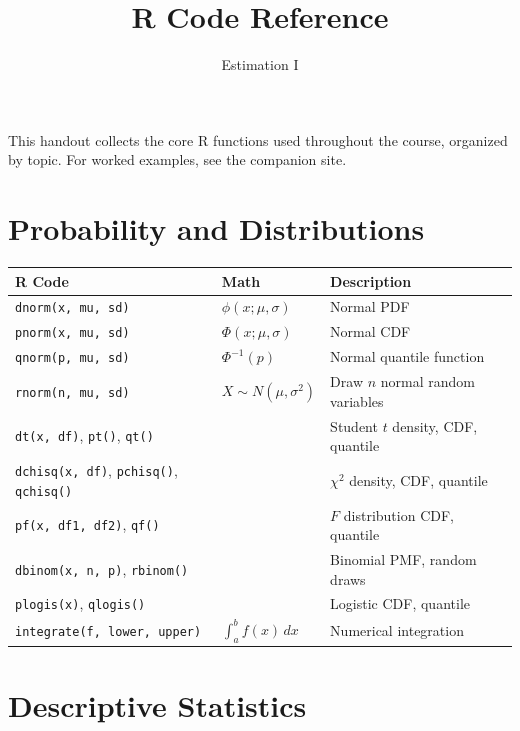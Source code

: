 \documentclass[11pt]{article}
\title{\vspace{-1.5em}R Code Reference}
\author{Estimation I}
\date{}
\begin{document}
\maketitle
\vspace{-2.5em}

This handout collects the core R functions used throughout the course, organized by topic. For worked examples, see the companion site.

\section*{Probability and Distributions}

\begin{tabular}{@{}lll@{}}
\toprule
\textbf{R Code} & \textbf{Math} & \textbf{Description} \\
\midrule
\texttt{dnorm(x, mu, sd)} & $\phi(x;\mu,\sigma)$ & Normal PDF \\
\texttt{pnorm(x, mu, sd)} & $\Phi(x;\mu,\sigma)$ & Normal CDF \\
\texttt{qnorm(p, mu, sd)} & $\Phi^{-1}(p)$ & Normal quantile function \\
\texttt{rnorm(n, mu, sd)} & $X \sim N(\mu,\sigma^2)$ & Draw $n$ normal random variables \\
\addlinespace
\texttt{dt(x, df)}, \texttt{pt()}, \texttt{qt()} & & Student $t$ density, CDF, quantile \\
\texttt{dchisq(x, df)}, \texttt{pchisq()}, \texttt{qchisq()} & & $\chi^2$ density, CDF, quantile \\
\texttt{pf(x, df1, df2)}, \texttt{qf()} & & $F$ distribution CDF, quantile \\
\texttt{dbinom(x, n, p)}, \texttt{rbinom()} & & Binomial PMF, random draws \\
\texttt{plogis(x)}, \texttt{qlogis()} & & Logistic CDF, quantile \\
\addlinespace
\texttt{integrate(f, lower, upper)} & $\int_a^b f(x)\,dx$ & Numerical integration \\
\bottomrule
\end{tabular}

\section*{Descriptive Statistics}
\end{document}
